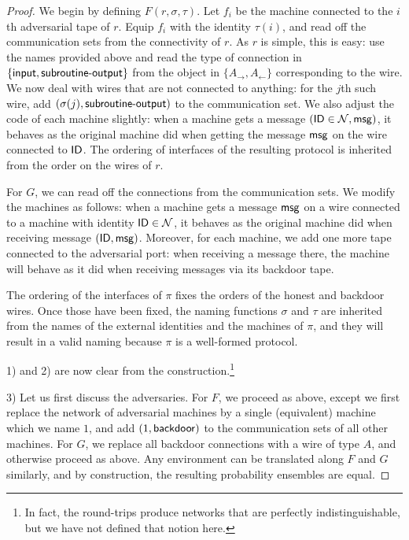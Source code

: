 \begin{proof}
We begin by defining $F(r,\sigma,\tau)$. Let $f_i$ be the machine connected to the $i$th adversarial tape of $r$. Equip $f_i$ with the identity $\tau(i)$, and read off the communication sets from the connectivity of $r$. As $r$ is simple, this is easy: use the names provided above and read the type of connection in $\{\mathsf{input},\mathsf{subroutine\textsf{-}output} \}$ from the object in $\{A_\rightarrow,A_\leftarrow\}$ corresponding to the wire.  We now deal with wires that are not connected to anything: for the $j$th such wire, add $(\sigma(j),\mathsf{subroutine\textsf{-}output})$ to the communication set. We also adjust the code of each machine slightly: when a machine gets a message $(\mathsf{ID}\in \mathcal{N},\mathsf{msg})$,  it behaves as the original machine did when getting the message $\mathsf{msg}$ on the wire connected to $\mathsf{ID}$. The ordering of interfaces of the resulting protocol is inherited from the order on the wires of $r$. 

For $G$, we can read off the connections from the communication sets.  We modify the machines as follows: when a machine gets a message $\mathsf{msg}$ on a wire connected to a machine with identity $\mathsf{ID}\in \mathcal{N}$, it behaves as the original machine did when receiving message $(\mathsf{ID},\mathsf{msg})$. Moreover, for each machine, we add one more tape connected to the adversarial port: when receiving a message there, the machine will behave as it did when receiving messages via its backdoor tape. 

The ordering of the interfaces of $\pi$ fixes the orders of the honest and backdoor wires. Once those have been fixed, the naming functions $\sigma$ and $\tau$ are inherited from the names of the external identities and the machines of $\pi$, and they will result in a valid naming because $\pi$ is a well-formed protocol.

1) and 2) are now clear from the construction.\footnote{In fact, the round-trips produce networks that are perfectly indistinguishable, but we have not defined that notion here.}

3) Let us first discuss the adversaries. For $F$, we proceed as above, except we first replace the network of adversarial machines by a single (equivalent) machine which we name $1$, and add $(1,\mathsf{backdoor})$ to the communication sets of all other machines. For $G$, we replace all backdoor connections with a wire of type $A$, and otherwise proceed as above.  Any environment can be translated along $F$ and $G$ similarly, 
and by construction, the resulting probability ensembles are equal.


\end{proof}
